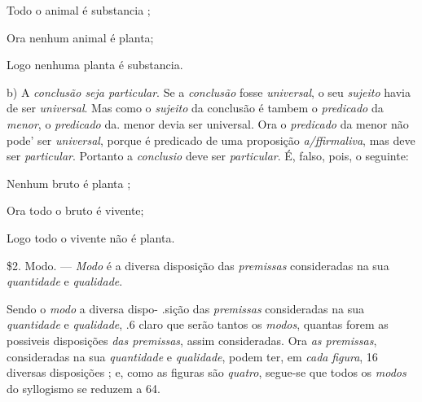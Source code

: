 Todo o animal é substancia ;

Ora nenhum animal é planta;

Logo nenhuma planta é substancia.

b) A \emph{conclusão seja particular}. Se a \emph{conclusão} fosse \emph{universal}, o seu \emph{sujeito} havia de ser \emph{universal}. Mas como o \emph{sujeito} da conclusão é tambem o \emph{predicado} da \emph{menor}, o \emph{predicado} da. menor devia ser universal. Ora o \emph{predicado} da menor não pode' ser \emph{universal}, porque é predicado de uma proposição \emph{a/ffirmaliva}, mas deve ser \emph{particular}. Portanto a \emph{conclusio} deve ser \emph{particular}. É, falso, pois, o seguinte:

Nenhum bruto é planta ;

Ora todo o bruto é vivente;

Logo todo o vivente não é planta.

\$2. Modo. --- \emph{Modo} é a diversa disposição das \emph{premissas} consideradas na sua \emph{quantidade} e \emph{qualidade}.


Sendo o \emph{modo} a diversa dispo- .sição das \emph{premissas} consideradas na sua \emph{quantidade} e \emph{qualidade}, .6 claro que serão tantos os \emph{modos}, quantas forem as possiveis disposições \emph{das premissas}, assim consideradas. Ora \emph{as premissas}, consideradas na sua \emph{quantidade} e \emph{qualidade}, podem ter, em \emph{cada}     \emph{figura}, 16 diversas disposições ; e, como as figuras são \emph{quatro}, segue-se que todos os \emph{modos} do syllogismo se reduzem a 64.

